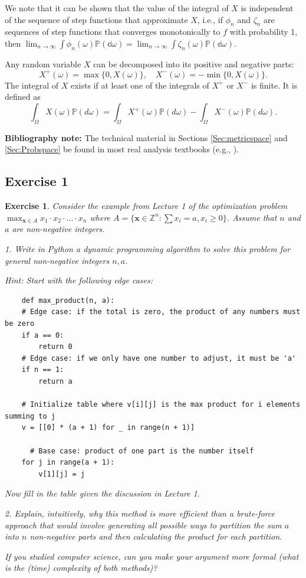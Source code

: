 \documentclass[letter,11pt]{article}
\newtheorem{exercise}{Exercise}[section]
\begin{document}
We note that it can be shown that the value of the integral of $X$ is independent of the sequence of step functions that approximate $X$, i.e., if $\phi_{n}$ and $\zeta_{n}$ are sequences of step functions that converges monotonically to $f$ with probability 1, then $\lim _{n \rightarrow \infty}  \int  \phi_{n}  (\omega)  \mathbb{P(d \omega) } = \lim _{n \rightarrow \infty} \int \zeta_{n} (\omega) \mathbb{P (d\omega) } $.

Any random variable $X$ can be decomposed into its positive and negative parts:
\[
X^+(\omega) = \max\{0, X(\omega)\}, \quad X^-(\omega) = -\min\{0, X(\omega)\}.
\]
The integral of $X$ exists if at least one of the integrals of $X^+$ or $X^-$ is finite. It is defined as
\[
\int_{\Omega} X(\omega) \mathbb{P}(d\omega) = \int_{\Omega} X^+(\omega) \mathbb{P}(d\omega) - \int_{\Omega} X^-(\omega) \mathbb{P}(d\omega).
\]

\textbf{Bibliography note:} The technical material in Sections \ref{Sec:metricspace} and \ref{Sec:Probspace} be found in most real analysis textbooks (e.g., \cite{aliprantis1998principles}).


\subsection{Exercise 1}

\begin{exercise}
    Consider the example from Lecture 1 of the optimization problem $\max _{ \boldsymbol{x} \in A  } x_{1} \cdot x_{2} \cdot \ldots \cdot x_{n}$
where $A = \{ \boldsymbol{x} \in \mathbb{Z}^{n} : \sum x_{i} = a, x_{i} \geq 0 \}$. Assume that $n$ and $a$ are non-negative integers. 

1. Write in Python a dynamic programming algorithm to solve this problem for general non-negative integers $n,a$.

Hint: Start with the following edge cases: 

\begin{verbatim}
    def max_product(n, a):
    # Edge case: if the total is zero, the product of any numbers must be zero
    if a == 0:
        return 0
    # Edge case: if we only have one number to adjust, it must be 'a'
    if n == 1:
        return a

    # Initialize table where v[i][j] is the max product for i elements summing to j
    v = [[0] * (a + 1) for _ in range(n + 1)]

      # Base case: product of one part is the number itself
    for j in range(a + 1):
        v[1][j] = j
\end{verbatim}

Now fill in the table given the discussion in Lecture 1. 

2.  Explain, intuitively, why this method is more efficient than a brute-force approach that would involve generating all possible ways to partition the sum 
$a$ into $n$
non-negative parts and then calculating the product for each partition. 

If you studied computer science, can you make your argument more formal (what is the (time) complexity of both methods)?
\end{exercise}
\end{document}
